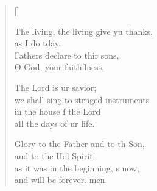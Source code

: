 \begin{verse}[\versewidth]
\begin{patverse}
The living, the living give yu thanks,\Med\\
as I do tday.\\
Fathers declare to thir sons,\Med\\
O God, your faithflness.

The Lord is ur savior;\Med\\
we shall sing to str\pointup{\i}nged instruments\\
in the house f the Lord\Med\\
all the days of ur life.

Glory to the Father and to th Son,\Med\\
and to the Hol Spirit:\\
as it was in the beginning, \pointup{\i}s now,\Med\\
and will be forever. men. 
  \end{patverse}
\end{verse}
